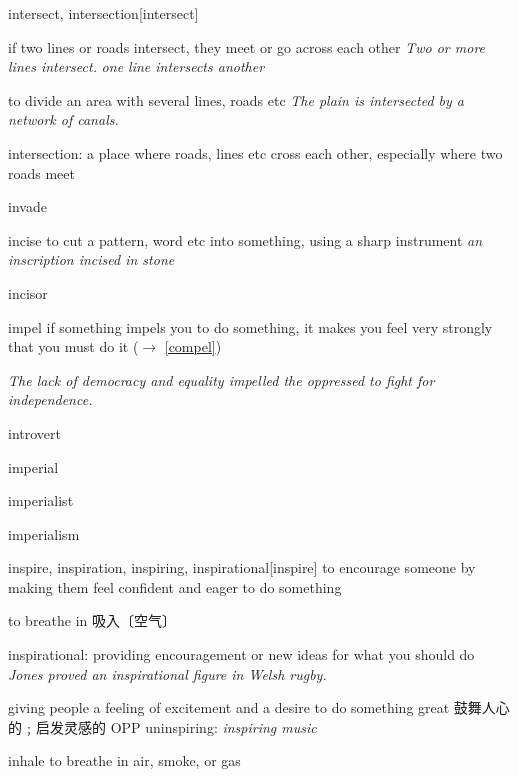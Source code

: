 \begin{word}{intersect, intersection}[intersect]
    
    if two lines or roads intersect, they meet or go across each other
    \textit{Two or more lines intersect.}
    \textit{one line intersects another}

    to divide an area with several lines, roads etc
    \textit{The plain is intersected by a network of canals.}

    intersection: a place where roads, lines etc cross each other, especially where two roads meet
\end{word}

\begin{word}{invade}
\end{word}


\begin{word}{incise}
    to cut a pattern, word etc into something, using a sharp instrument
    \textit{an inscription incised in stone}
\end{word}

\begin{word}{incisor}
\end{word}

\begin{word}{impel}
    if something impels you to do something, it makes you feel very strongly that you must do it ($\rightarrow$ \ref{compel})

    \textit{The lack of democracy and equality impelled the oppressed to fight for independence.}
\end{word}



\begin{word}{introvert}
\end{word}

\begin{word}{imperial}
\end{word}

\begin{word}{imperialist}
\end{word}

\begin{word}{imperialism}
\end{word}

\begin{word}{inspire, inspiration, inspiring, inspirational}[inspire]
    to encourage someone by making them feel confident and eager to do something

    to breathe in 吸入〔空气〕

    inspirational: providing encouragement or new ideas for what you should do
    \textit{Jones proved an inspirational figure in Welsh rugby.}


    giving people a feeling of excitement and a desire to do something great 鼓舞人心的﹔启发灵感的 OPP  uninspiring:
    \textit{inspiring music}
\end{word}

\begin{word}{inhale}
    to breathe in air, smoke, or gas
\end{word}